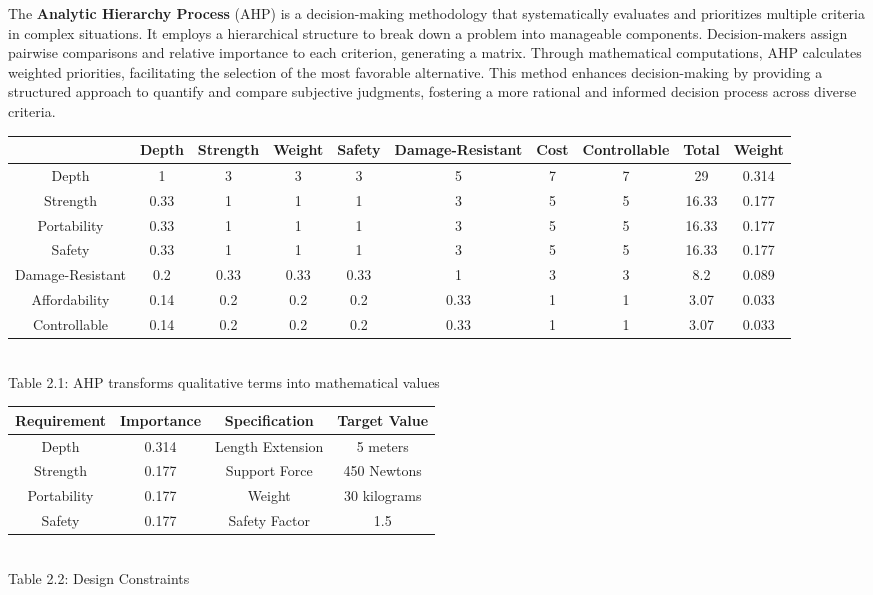 \documentclass[a4,10pt]{report}
\begin{document}
The \textbf{Analytic Hierarchy Process} (AHP) is a decision-making methodology that systematically evaluates and prioritizes multiple criteria in complex situations. It employs a hierarchical structure to break down a problem into manageable components. Decision-makers assign pairwise comparisons and relative importance to each criterion, generating a matrix. Through mathematical computations, AHP calculates weighted priorities, facilitating the selection of the most favorable alternative. This method enhances decision-making by providing a structured approach to quantify and compare subjective judgments, fostering a more rational and informed decision process across diverse criteria.
\begin{center}
\scriptsize{
\begin{tabular}{ | c | c | c | c | c | c | c | c | c | c |}
    \hline
    & Depth & Strength & Weight & Safety & Damage-Resistant & Cost & Controllable & Total & Weight \\
    \hline
    Depth & 1 & 3 & 3 & 3 & 5 & 7 & 7 & 29 & 0.314 \\
    Strength & 0.33 & 1 & 1 & 1 & 3 & 5 & 5 & 16.33 & 0.177 \\
    Portability & 0.33 & 1 & 1 & 1 & 3 & 5 & 5 & 16.33 & 0.177 \\
    Safety & 0.33 & 1 & 1 & 1 & 3 & 5 & 5 & 16.33 & 0.177 \\
    Damage-Resistant & 0.2 & 0.33 & 0.33 & 0.33 & 1 & 3 & 3 & 8.2 & 0.089 \\
    Affordability & 0.14 & 0.2 & 0.2 & 0.2 & 0.33 & 1 & 1 & 3.07 & 0.033 \\
    Controllable & 0.14 & 0.2 & 0.2 & 0.2 & 0.33 & 1 & 1 & 3.07 & 0.033 \\
    \hline
\end{tabular} \\
\normalsize{Table 2.1: AHP transforms qualitative terms into mathematical values}
}
\end{center}
\begin{center}
    \begin{tabular}{|c|c|c|c|}
        \hline 
        Requirement & Importance & Specification & Target Value \\
        \hline 
        Depth & 0.314 & Length Extension & 5 meters \\
        Strength & 0.177 & Support Force & 450 Newtons \\
        Portability & 0.177 & Weight & 30 kilograms \\
        Safety & 0.177 & Safety Factor & 1.5 \\
        \hline
    \end{tabular} \\
    \normalsize{Table 2.2: Design Constraints}
\end{center}
\end{document}
